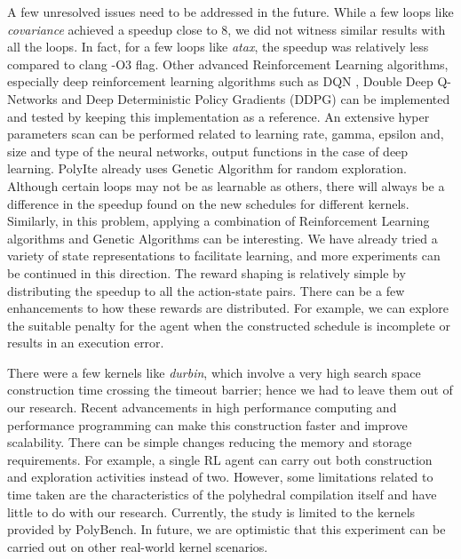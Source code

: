 \documentclass[logo,msc]{infthesis}           %
\begin{document}
A few unresolved issues need to be addressed in the future. While a few loops like \textit{covariance} achieved a speedup close to 8, we did not witness similar results with all the loops. In fact, for a few loops like \textit{atax}, the speedup was relatively less compared to clang -O3 flag. Other advanced Reinforcement Learning algorithms, especially deep reinforcement learning algorithms such as DQN \cite{DBLP:journals/corr/MnihKSGAWR13}, Double Deep Q-Networks \cite{DDQN} and Deep Deterministic Policy Gradients (DDPG) \cite{BHATNAGAR20092471} can be implemented and tested by keeping this implementation as a reference. An extensive hyper parameters scan can be performed related to learning rate, gamma, epsilon and, size and type of the neural networks, output functions in the case of deep learning. PolyIte already uses Genetic Algorithm for random exploration. Although certain loops may not be as learnable as others, there will always be a difference in the speedup found on the new schedules for different kernels.
Similarly, in this problem, applying a combination of Reinforcement Learning algorithms and Genetic Algorithms\cite{GA} can be interesting. We have already tried a variety of state representations to facilitate learning, and more experiments can be continued in this direction. The reward shaping is relatively simple by distributing the speedup to all the action-state pairs. There can be a few enhancements to how these rewards are distributed. For example, we can explore the suitable penalty for the agent when the constructed schedule is incomplete or results in an execution error.

There were a few kernels like \textit{durbin}, which involve a very high search space construction time crossing the timeout barrier; hence we had to leave them out of our research. Recent advancements in high performance computing and performance programming can make this construction faster and improve scalability. There can be simple changes reducing the memory and storage requirements. For example, a single RL agent can carry out both construction and exploration activities instead of two. However, some limitations related to time taken are the characteristics of the polyhedral compilation itself and have little to do with our research. Currently, the study is limited to the kernels provided by PolyBench. In future, we are optimistic that this experiment can be carried out on other real-world kernel scenarios.





\end{document}
